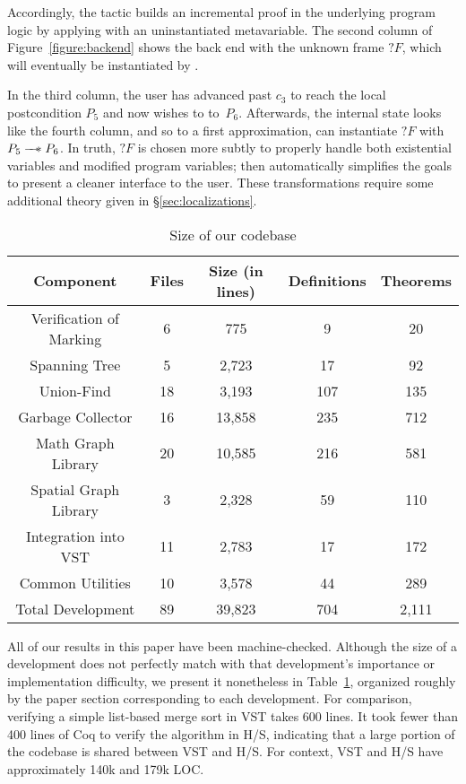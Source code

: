 Accordingly, the  tactic builds an incremental proof in the underlying program logic by applying  with an uninstantiated metavariable.
The second column of Figure~\ref{figure:backend} shows the back end with the unknown frame $?F$, which will eventually be instantiated by .

In the third column, the user has advanced past $c_3$ to reach the local postcondition $P_5$ and now wishes to  to~$P_6$.  Afterwards, the internal state looks like the fourth column, and so to a first approximation,  can instantiate $?F$ with $P_5 \mathrel{\mbox{$\hspace*{-0.03em}\mathord{-}\hspace*{-0.4em} \mathord{-}\hspace*{-0.25em} \mathord{\mathbin{\ast}}$\hspace*{-0.005em}}} P_6$.  In truth, $?F$ is chosen more subtly to properly handle both existential variables and modified program variables;  then automatically simplifies the goals to present a cleaner interface to the user.  These transformations require some additional theory given in \S\ref{sec:localizations}.


\begin{table}[t]
\centering
\begin{tabular}{c|c|c|c|c}
Component & Files & Size (in lines) & Definitions & Theorems\\\hline
Verification of Marking & 6 & 775 & 9 & 20 \\
Spanning Tree & 5 & 2,723 & 17 & 92 \\
Union-Find & 18 & 3,193 & 107 & 135 \\
Garbage Collector & 16 & 13,858 & 235 & 712 \\
Math Graph Library & 20 & 10,585 & 216 & 581 \\
Spatial Graph Library & 3 & 2,328 & 59 & 110 \\
Integration into VST & 11 & 2,783 & 17 & 172 \\
Common Utilities & 10 & 3,578 & 44 & 289 \\
\hline\hline
Total Development & 89 & 39,823 & 704 & 2,111 \\
\end{tabular}
\caption{Size of our codebase}
\label{tab:codebase}
\end{table}

All of our results in this paper have been machine-checked.  
Although the size of a development does not perfectly match with that development's importance or implementation difficulty, we present it nonetheless in Table~\ref{tab:codebase}, organized roughly by the paper section corresponding to each development.  For comparison, verifying a simple list-based merge sort in VST takes 600 lines.  It took fewer than 400 lines of Coq to verify the  algorithm in H/S, indicating that a large portion of the codebase is shared between VST and H/S.  For context, VST and H/S have approximately 140k and 179k LOC.

